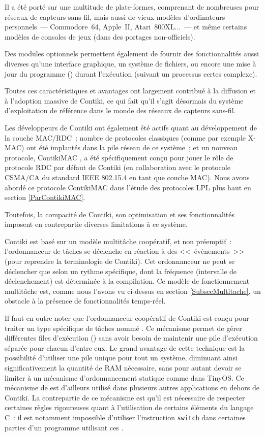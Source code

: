 Il a été porté sur une multitude de plate-formes, comprenant de nombreuses
 pour réseaux de capteurs sans-fil, mais aussi de vieux modèles
d'ordinateurs personnels~--- Commodore~64, Apple~II, Atari~800XL...~---
et même certains modèles de consoles de jeux (dans des portages
non-officiels).

Des modules optionnels permettent également de fournir des fonctionnalités
aussi diverses qu'une interface graphique, un système de fichiers, ou
encore une mise à jour du programme () durant
l'exécution (suivant un processus certes complexe).

Toutes ces caractéristiques et avantages ont largement contribué à la
diffusion et à l'adoption massive de Contiki, ce qui fait qu'il s'agit
désormais du système d'exploitation de référence dans le monde des
réseaux de capteurs sans-fil.

Les développeurs de Contiki ont également été actifs quant au développement
de la couche MAC/RDC~: nombre de protocoles classiques (comme par exemple
X-MAC) ont été implantés dans la pile réseau de ce système~; et un nouveau
protocole, ContikiMAC \cite{ContikiMAC}, a été spécifiquement conçu pour
jouer le rôle de protocole RDC par défaut de Contiki (en collaboration avec
le protocole CSMA/CA du standard IEEE 802.15.4 en tant que couche MAC).
Nous avons abordé ce protocole ContikiMAC dans l'étude des protocoles
LPL plus haut en section \vref{ParContikiMAC}.

Toutefois, la compacité de Contiki, son optimisation et ses fonctionnalités
imposent en contrepartie diverses limitations à ce système.

Contiki est basé sur un modèle multitâche coopératif, et non préemptif~:
l'ordonnanceur de tâches se déclenche en réaction à des <<~évènements~>>
(pour reprendre la terminologie de Contiki). Cet ordonnanceur ne peut se
déclencher que selon un rythme spécifique, dont la fréquence (intervalle
de déclenchement) est déterminée à la compilation. Ce modèle de
fonctionnement multitâche est, comme nous l'avons vu ci-dessus en section
\vref{SubsecMultitache}, un obstacle à la présence de fonctionnalités
temps-réel.

Il faut en outre noter que l'ordonnanceur coopératif de Contiki est
conçu pour traiter un type spécifique de tâches nommé 
\cite{Protothreads}. Ce mécanisme permet de gérer différentes files
d'exécution () sans avoir besoin de maintenir
une pile d'exécution séparée pour chacun d'entre eux.
Le grand avantage de cette technique est la possibilité d'utiliser une pile
unique pour tout un système, diminuant ainsi significativement la quantité
de RAM nécessaire, sans pour autant devoir se limiter à un mécanisme
d'ordonnancement statique comme dans TinyOS.
Ce mécanisme de  est d'ailleurs utilisé dans
plusieurs autres applications en dehors de Contiki.
La contrepartie de ce mécanisme est qu'il est nécessaire de respecter
certaines règles rigoureuses quant à l'utilisation de certains éléments
du langage C~: il est notamment impossible d'utiliser l'instruction
\texttt{switch} dans certaines parties d'un programme utilisant ces
.


